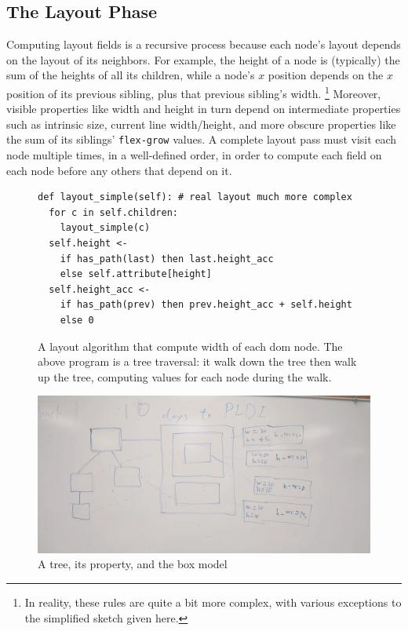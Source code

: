 \subsection{The Layout Phase}

Computing layout fields is a recursive process
  because each node's layout depends on the layout of its neighbors.
For example, the height of a node is (typically)
  the sum of the heights of all its children,
  while a node's $x$ position depends on the $x$ position
  of its previous sibling, plus that previous sibling's width.%
\footnote{
  In reality, these rules are quite a bit more complex,
    with various exceptions to the simplified sketch given here.}
Moreover, visible properties like width and height
  in turn depend on intermediate properties such as intrinsic size,
  current line width/height, and more obscure properties
  like the sum of its siblings' \texttt{flex-grow} values.
A complete layout pass must visit each node multiple times,
  in a well-defined order,
  in order to compute each field on each node
  before any others that depend on it.

\begin{figure}
\begin{verbatim}
def layout_simple(self): # real layout much more complex
  for c in self.children:
    layout_simple(c)
  self.height <-
    if has_path(last) then last.height_acc 
    else self.attribute[height]
  self.height_acc <-
    if has_path(prev) then prev.height_acc + self.height 
    else 0
\end{verbatim}
\caption{A layout algorithm that compute width of each dom node. The above program is a tree traversal: it walk down the tree then walk up the tree, computing values for each node during the walk.}
\label{fig:layout-simple}
\end{figure}

\begin{figure}
\centering
\includegraphics[scale=0.15]{layout.jpg}
\caption{A tree, its property, and the box model}
\end{figure}

